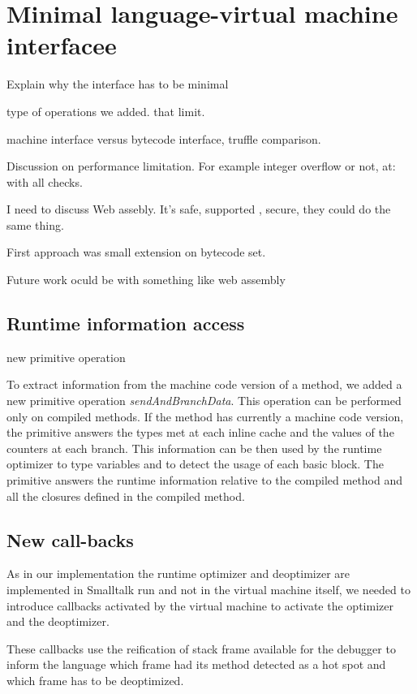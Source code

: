 \documentclass[a4paper,12pt,twoside]{../includes/ThesisStyle}
\begin{document}
\fi

\chapter{Minimal language-virtual machine interfacee}
\label{chap:interface}
\minitoc


Explain why the interface has to be minimal

type of operations we added. that limit.

machine interface versus bytecode interface, truffle comparison.

Discussion on performance limitation. For example integer overflow or not, at: with all checks.

I need to discuss Web assebly. It's safe, supported , secure, they could do the same thing.

First approach was small extension on bytecode set.

Future work oculd be with something like web assembly

\section{Runtime information access}

new primitive operation

To extract information from the machine code version of a method, we added a new primitive operation \emph{sendAndBranchData}. This operation can be performed only on compiled methods. If the method has currently a machine code version, the primitive answers the types met at each inline cache and the values of the counters at each branch. This information can be then used by the runtime optimizer to type variables and to detect the usage of each basic block. The primitive answers the runtime information relative to the compiled method and all the closures defined in the compiled method.

\section{New call-backs}

As in our implementation the runtime optimizer and deoptimizer are implemented in Smalltalk run and not in the virtual machine itself, we needed to introduce callbacks activated by the virtual machine to activate the optimizer and the deoptimizer. 

These callbacks use the reification of stack frame available for the debugger to inform the language which frame had its method detected as a hot spot and which frame has to be deoptimized.
\end{document}
